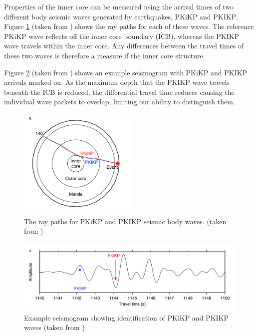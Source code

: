 \documentclass[11pt,a4paper]{article}
\begin{document}
Properties of the inner core can be measured using the arrival times of two different body seismic waves generated by earthquakes, PKiKP and PKIKP. Figure \ref{fig:RayPaths} (taken from \cite{Waszek2011a}) shows the ray paths for each of these waves. The reference PKiKP wave reflects off the inner core boundary (ICB), whereas the PKIKP wave travels within the inner core. Any differences between the travel times of these two waves is therefore a measure if the inner core structure.

Figure \ref{fig:Seismogram} (taken from \cite{Waszek2011a}) shows an example seismogram with PKiKP and PKIKP arrivals marked on. As the maximum depth that the PKIKP wave travels beneath the ICB is reduced, the differential travel time reduces causing the individual wave packets to overlap, limiting our ability to distinguish them.

\begin{figure}
	\centering
	\includegraphics[width=0.5\textwidth]{RayPaths.png}
	\caption{The ray paths for PKiKP and PKIKP seismic body waves. (taken from \cite{Waszek2011a})}
	\label{fig:RayPaths}
\end{figure}

\begin{figure}
	\centering
	\includegraphics[width=\textwidth]{Seismogram.png}
	\caption{Example seismogram showing identification of PKiKP and PKIKP waves (taken from \cite{Waszek2011a})}
	\label{fig:Seismogram}
\end{figure}
\end{document}
